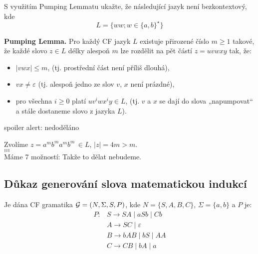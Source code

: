 S využitím Pumping Lemmatu ukažte, že následující jazyk není bezkontextový, kde $$L = \{ww; w \in\{a,b\}^{\star}\}$$


\textbf{Pumping Lemma.} Pro každý CF jazyk $L$ existuje přirozené číslo $m \geq 1$ takové, že každé slovo $z \in L$ 
délky alespoň $m$ lze rozdělit na pět částí $z = uvwxy$ tak, že:

\begin{itemize}[label=\textbullet]
    \item $\lvert vwx \rvert \leq m$, (tj. prostřední část není příliš dlouhá),
    \item $vx \neq \varepsilon$ (tj. alespoň jedno ze slov $v$, $x$ není prázdné),
    \item pro všechna $i \geq 0$ platí $uv^i wx^i y \in L$, (tj. $v$ a $x$ se dají do slova „napumpovat“ a stále 
    dostaneme slovo z jazyka $L$).
\end{itemize}

spoiler alert: nedoděláno 

Zvolíme $z = a^m b^m a^m b^m \, \in L$, $|z| = 4m > m$. \\ 
$\dots$\\
$\dots$\\
$\dots$\\

Máme 7 možností: 
Takže to dělat nebudeme. 


\subsection{Důkaz generování slova matematickou indukcí} %
Je dána CF gramatika $\mathcal{G} = (N, \Sigma, S, P)$, kde $N = \{S, A, B, C\}$, $\Sigma = \{a, b\}$ a $P$ je:
\begin{align*}
    P: & S \rightarrow SA \mid aSb \mid Cb \\
       & A \rightarrow SC \mid \varepsilon \\
       & B \rightarrow bAB \mid bS \mid AA \\
       & C \rightarrow CB \mid bA \mid a \\
\end{align*}

